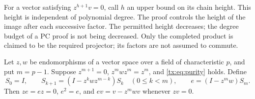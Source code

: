 For a vector satisfying $z^{h+1}v=0$, call $h$ an upper bound on
its chain height. This height is independent of polynomial degree.
The proof controls the height of the image after each successive
factor. The permitted height decreases; the degree budget of a PC
proof is not being decreased. Only the completed product is claimed
to be the required projector; its factors are not assumed to commute.

\begin{lemma}\label{tx:lem:prime-projector}
Let $z,w$ be endomorphisms of a vector space over a field of
characteristic $p$, and put $m=p-1$. Suppose $z^{m+1}=0$,
$z^mwz^m=z^m$, and \eqref{tx:eq:purity} holds. Define
\begin{equation}\label{tx:eq:prime-projector}
S_0=I,\qquad S_{k+1}=(I-z^kwz^{m-k})S_k\quad(0\le k<m),
\qquad e=(I-z^mw)S_m.
\end{equation}
Then $ze=ez=0$, $e^2=e$, and $ev=v-z^mwv$ whenever $zv=0$.
\end{lemma}
